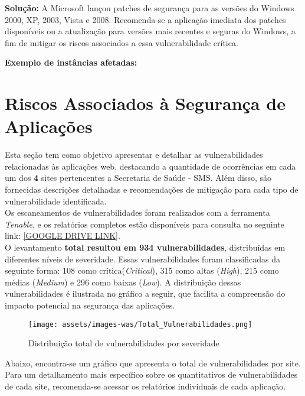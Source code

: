 \documentclass[a4paper,12pt]{article}
\begin{document}
\textbf{Solução:}
A Microsoft lançou patches de segurança para as versões do Windows 2000, XP, 2003, Vista e 2008.
Recomenda-se a aplicação imediata dos patches disponíveis ou a atualização para versões mais recentes e seguras do Windows, a fim de mitigar os riscos associados a essa vulnerabilidade crítica.



\textbf{Exemplo de instâncias afetadas:}
\begin{itemize}
\end{itemize}
\section{Riscos Associados à Segurança de Aplicações}

Esta seção tem como objetivo apresentar e detalhar as vulnerabilidades relacionadas às aplicações web, destacando a quantidade de ocorrências em cada um dos \textbf{4} sites pertencentes a Secretaria de Saúde - SMS. Além disso, são fornecidas descrições detalhadas e recomendações de mitigação para cada tipo de vulnerabilidade identificada.\\

Os escaneamentos de vulnerabilidades foram realizados com a ferramenta \textit{Tenable}, e os relatórios completos estão disponíveis para consulta no seguinte link: \url{[GOOGLE DRIVE LINK]}.\\

O levantamento \textbf{total resultou em 934 vulnerabilidades}, distribuídas em diferentes níveis de severidade. Essas vulnerabilidades foram classificadas da seguinte forma: 108 como crítica(\textit{Critical}), 315 como altas (\textit{High}), 215 como médias (\textit{Medium}) e 296 como baixas (\textit{Low}). A distribuição dessas vulnerabilidades é ilustrada no gráfico a seguir, que facilita a compreensão do impacto potencial na segurança das aplicações.

\begin{figure}[h!]
    \centering
    \texttt{[image: assets/images-was/Total\_Vulnerabilidades.png]}
    \caption{Distribuição total de vulnerabilidades por severidade}
\end{figure}
\FloatBarrier

Abaixo, encontra-se um gráfico que apresenta o total de vulnerabilidades por site. Para um detalhamento mais específico sobre os quantitativos de vulnerabilidades de cada site, recomenda-se acessar os relatórios individuais de cada aplicação.
\end{document}
